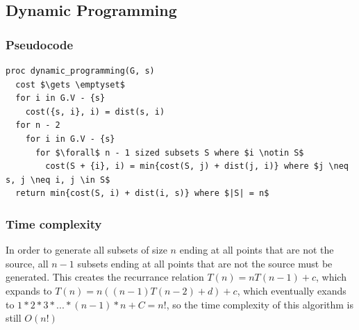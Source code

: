 \documentclass[a4paper,12pt]{article}
\begin{document}
\subsection{Dynamic Programming}
\subsubsection{Pseudocode}
\begin{lstlisting}[mathescape=true]
proc dynamic_programming(G, s)
  cost $\gets \emptyset$
  for i in G.V - {s}
    cost({s, i}, i) = dist(s, i)
  for n - 2
    for i in G.V - {s}
      for $\forall$ n - 1 sized subsets S where $i \notin S$
        cost(S + {i}, i) = min{cost(S, j) + dist(j, i)} where $j \neq s, j \neq i, j \in S$
  return min{cost(S, i) + dist(i, s)} where $|S| = n$    
\end{lstlisting}
\subsubsection{Time complexity}
In order to generate all subsets of size $n$ ending at all points that are not the source, all $n - 1$ subsets ending at all points that are not the source must be generated. This creates the recurrance relation $T(n) = nT(n - 1) + c$, which expands to $T(n) = n((n - 1)T(n - 2) + d) + c$, which eventually exands to $1 * 2 * 3 * ... * (n - 1) * n + C = n!$, so the time complexity of this algorithm is still $O(n!)$ 
\end{document}
